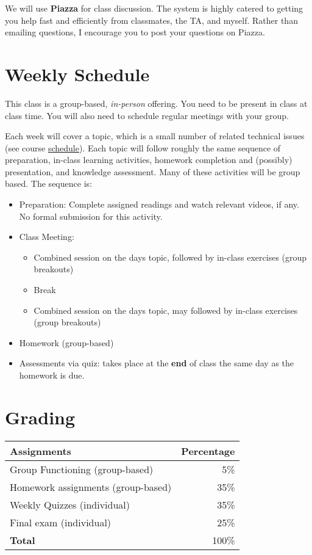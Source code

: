 \documentclass[11pt]{article}
\begin{document}
We will use \textbf{Piazza} for class discussion. The system is highly catered to getting you help fast and efficiently from classmates, the TA, and myself. Rather than emailing questions, I encourage you to post your questions on Piazza. 

\section{Weekly Schedule}

This class is a group-based, \emph{in-person} offering. You need to be
present in class at class time. You will also need to schedule regular
meetings with your group.

Each week will cover a topic, which is a small number of related
technical issues (see course \href{https://nguyenthanhvuh.github.io/class-oo/assignments}{schedule}). Each
topic will follow roughly the same sequence of preparation, in-class
learning activities, homework completion and (possibly) presentation,
and knowledge assessment. Many of these activities will be group based.
The sequence is:

\begin{itemize}
\item
  Preparation: Complete assigned readings and watch relevant videos, if
  any. No formal submission for this activity.
\item
  Class Meeting:

  \begin{itemize}
  \item
    Combined session on the day\textquotesingle s topic, followed by
    in-class exercises (group breakouts)
  \item
    Break
  \item
    Combined session on the day\textquotesingle s topic, may followed by
    in-class exercises (group breakouts)
  \end{itemize}
\item
  Homework (group-based)
\item
  Assessments via quiz: takes place at the \textbf{end} of class the
  same day as the homework is due.
\end{itemize}

\section{Grading}\label{sec:grading}

\begin{tabular}{lr}
\textbf{Assignments} & \textbf{Percentage} \\
\hline
Group Functioning (group-based) & 5\% \\
Homework assignments (group-based) & 35\% \\
Weekly Quizzes (individual) & 35\% \\
  Final exam (individual) & 25\% \\
  \hline
    \textbf{Total} & 100\% \\
\end{tabular}
\end{document}
